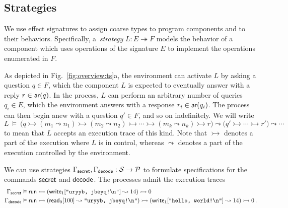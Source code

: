 \subsection{Strategies} \label{sec:strat} %

We use effect signatures to assign coarse types
to program components and to their behaviors.
Specifically,
a~\emph{strategy} $L : E \twoheadrightarrow F$
models the behavior of a component which
uses operations of the signature $E$ to
implement the operations enumerated in $F$.

As depicted in Fig.~\ref{fig:overview:ts}a,
the environment can activate $L$ by asking a question $q \in F$,
which the component $L$ is expected to eventually answer
with a reply $r \in  \mathsf{ar} (q)$.
In the process,
$L$ can perform an arbitrary number of queries $q_i \in E$,
which the environment answers with a response $r_i \in  \mathsf{ar} (q_i)$.
The process can then begin anew with a question $q' \in F$,
and so on indefinitely.
We will write
\[
  L \:\vDash\: \big(q
    \rightarrowtail (m_1 \leadsto n_1)
    \rightarrowtail (m_2 \leadsto n_2)
    \rightarrowtail \cdots
    \rightarrowtail (m_k \leadsto n_k)
    \rightarrowtail r \big)
  \leadsto \big(q'
    \rightarrowtail \cdots
    \rightarrowtail r' \big)
  \leadsto \cdots
\]
to mean that $L$ accepts an execution trace of this kind.
Note that $\rightarrowtail$ denotes a part of the execution
where $L$ is in control,
whereas $\leadsto$ denotes a part of the execution
controlled by the environment.

\begin{example} \label{ex:decodespec} %
We can use strategies $\Gamma_{ \mathsf{secret} }, \Gamma_{ \mathsf{decode} } : \mathcal{S} \rightarrow \mathcal{P}$
to formulate specifications for the commands $ \mathsf{secret} $ and $ \mathsf{decode} $.
The processes admit the execution traces
{\small\begin{align*}
  \Gamma_{ \mathsf{secret} } &\vDash  \mathsf{run} 
    \rightarrowtail ( \mathsf{write} _1[\texttt{"uryyb, jbeyq!\textbackslash{}n"}] \leadsto 14)
    \rightarrowtail 0
  \\
  \Gamma_{ \mathsf{decode} } &\vDash  \mathsf{run} 
    \rightarrowtail ( \mathsf{read} _0[100] \leadsto \texttt{"uryyb, jbeyq!\textbackslash{}n"})
    \rightarrowtail ( \mathsf{write} _1[\texttt{"hello, world!\textbackslash{}n"}] \leadsto 14)
    \rightarrowtail 0
  \,.
\end{align*}}
\end{example}

